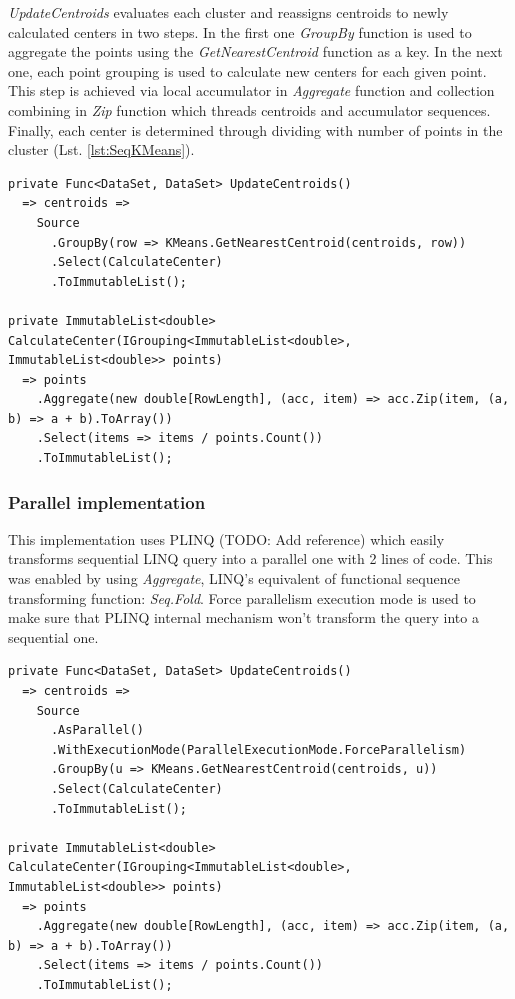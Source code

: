\emph{UpdateCentroids} evaluates each cluster and reassigns centroids to newly calculated centers in two steps. In the first one \emph{GroupBy} function is used to aggregate the points using the \emph{GetNearestCentroid} function as a key. In the next one, each point grouping is used to calculate new centers for each given point. This step is achieved via local accumulator in \emph{Aggregate} function and collection combining in \emph{Zip} function which threads centroids and accumulator sequences. Finally, each center is determined through dividing with number of points in the cluster (Lst. \ref{lst:SeqKMeans}).


\begin{lstlisting}[style=sharpcstyle, caption={Sequential k-means algorithm}, label={lst:SeqKMeans}]
private Func<DataSet, DataSet> UpdateCentroids()
  => centroids =>
    Source
      .GroupBy(row => KMeans.GetNearestCentroid(centroids, row))
      .Select(CalculateCenter)
      .ToImmutableList();

private ImmutableList<double> CalculateCenter(IGrouping<ImmutableList<double>, ImmutableList<double>> points) 
  => points
    .Aggregate(new double[RowLength], (acc, item) => acc.Zip(item, (a, b) => a + b).ToArray())
    .Select(items => items / points.Count())
    .ToImmutableList();
\end{lstlisting}

\subsubsection{Parallel implementation}

This  implementation uses PLINQ (TODO: Add reference) which easily transforms sequential LINQ query into a parallel one with 2 lines of code.
This was enabled by using \emph{Aggregate}, LINQ's equivalent of functional sequence transforming function: \emph{Seq.Fold}. Force parallelism execution mode is used to make sure that PLINQ internal mechanism won't transform the query into a sequential one.

\begin{lstlisting}[style=sharpcstyle, caption={Parallel k-means algorithm}, label={lst:ParKMeans}]
private Func<DataSet, DataSet> UpdateCentroids()
  => centroids =>
    Source
      .AsParallel()
      .WithExecutionMode(ParallelExecutionMode.ForceParallelism)
      .GroupBy(u => KMeans.GetNearestCentroid(centroids, u))
      .Select(CalculateCenter)
      .ToImmutableList();

private ImmutableList<double> CalculateCenter(IGrouping<ImmutableList<double>, ImmutableList<double>> points)
  => points
    .Aggregate(new double[RowLength], (acc, item) => acc.Zip(item, (a, b) => a + b).ToArray())
    .Select(items => items / points.Count())
    .ToImmutableList();
\end{lstlisting}

